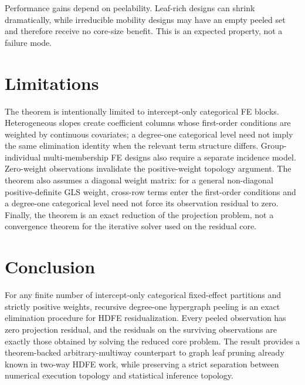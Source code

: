 \documentclass[11pt]{article}
\theoremstyle{definition}
\newcommand{\1}{\mathbf{1}}
\begin{document}
Performance gains depend on peelability. Leaf-rich designs can shrink dramatically, while irreducible mobility designs may have an empty peeled set and therefore receive no core-size benefit. This is an expected property, not a failure mode.

\section{Limitations}

The theorem is intentionally limited to intercept-only categorical FE blocks. Heterogeneous slopes create coefficient columns whose first-order conditions are weighted by continuous covariates; a degree-one categorical level need not imply the same elimination identity when the relevant term structure differs. Group-individual multi-membership FE designs also require a separate incidence model. Zero-weight observations invalidate the positive-weight topology argument. The theorem also assumes a diagonal weight matrix: for a general non-diagonal positive-definite GLS weight, cross-row terms enter the first-order conditions and a degree-one categorical level need not force its observation residual to zero. Finally, the theorem is an exact reduction of the projection problem, not a convergence theorem for the iterative solver used on the residual core.

\section{Conclusion}

For any finite number of intercept-only categorical fixed-effect partitions and strictly positive weights, recursive degree-one hypergraph peeling is an exact elimination procedure for HDFE residualization. Every peeled observation has zero projection residual, and the residuals on the surviving observations are exactly those obtained by solving the reduced core problem. The result provides a theorem-backed arbitrary-multiway counterpart to graph leaf pruning already known in two-way HDFE work, while preserving a strict separation between numerical execution topology and statistical inference topology.

\appendix

\end{document}

